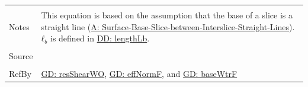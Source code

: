 \documentclass[12pt]{article}
\begin{document}
\begin{minipage}{\textwidth}
\begin{tabular}{>{\raggedright}p{}>{\raggedright\arraybackslash}p{}}
          \\ \midrule \\
          Notes & This equation is based on the assumption that the base of a slice is a straight line (\hyperref[assumpSBSBISL]{A: Surface-Base-Slice-between-Interslice-Straight-Lines}). ${\mathbf{ℓ}_{b}}$ is defined in \hyperref[DD:lengthLb]{DD: lengthLb}.
          \\ \midrule \\
          Source & \cite{fredlund1977}
          \\ \midrule \\
          RefBy & \hyperref[GD:resShearWO]{GD: resShearWO}, \hyperref[GD:effNormF]{GD: effNormF}, and \hyperref[GD:baseWtrF]{GD: baseWtrF}
          \\ \bottomrule
          \end{tabular}
          \end{minipage}
\end{document}
